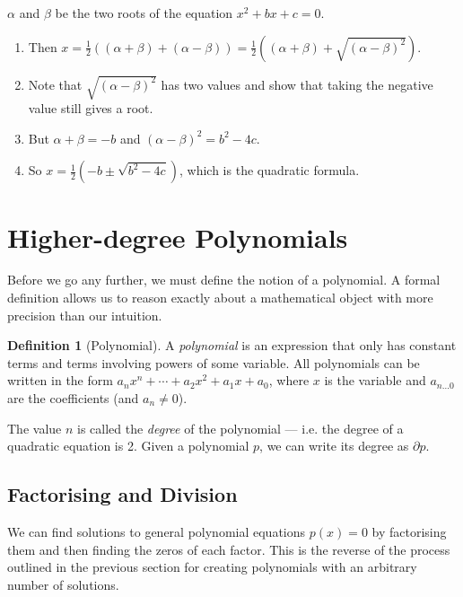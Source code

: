 \documentclass[a4paper,10pt,titlepage]{article}
\theoremstyle{definition}
\newtheorem*{defn}{Definition}
\begin{document}
\begin{enumerate}
        $ \alpha $ and $ \beta $ be the two roots of the equation $ x^2 + bx + c = 0 $. \label{ex:quadratificational}
        \begin{enumerate}
          \item Then $ x = \frac{1}{2} \left( (\alpha + \beta) + (\alpha - \beta) \right)
                         = \frac{1}{2} \left( (\alpha + \beta) + \sqrt{(\alpha - \beta)^2} \right) $.
          \item Note that $ \sqrt{(\alpha - \beta)^2} $ has two values and show that taking the negative
                value still gives a root.
          \item But $ \alpha + \beta = -b $ and $ (\alpha - \beta)^2 = b^2 - 4c $.
          \item So $ x = \frac{1}{2} \left( -b \pm \sqrt{b^2 - 4c} \right) $, which is the quadratic formula.
        \end{enumerate}
\end{enumerate}

\section{Higher-degree Polynomials}\label{section:poly}
Before we go any further, we must define the notion of a polynomial. A formal definition
allows us to reason exactly about a mathematical object with more precision than our
intuition.

\begin{defn}[Polynomial]
  A \emph{polynomial} is an expression that only has constant terms and terms involving
  powers of some variable. All polynomials can be written in the form
  $ a_n x^n + \cdots + a_2 x^2 + a_1 x + a_0 $, where $ x $ is the variable and
  $ a_{n...0} $ are the coefficients (and $ a_n \neq 0 $).

  The value $ n $ is called the \emph{degree} of the polynomial --- i.e. the degree of a
  quadratic equation is 2. Given a polynomial $ p $, we can write its degree as $ \partial p $.
\end{defn}

\subsection*{Factorising and Division}
We can find solutions to general polynomial equations $ p(x) = 0 $ by factorising
them and then finding the zeros of each factor. This is the reverse of the process
outlined in the previous section for creating polynomials with an arbitrary number of solutions.
\end{document}
